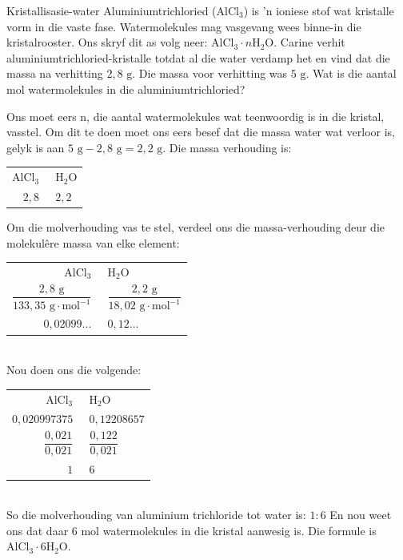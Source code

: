     \noindent
\par
            \label{m38712*eid672431}
      \noindent
      \begin{wex}{Kristallisasie-water}{
\label{m38712*pid47982}
\label{m38712*id64827}Aluminiumtrichloried (${\text{AlCl}}_{3}$) is  'n ioniese stof wat kristalle vorm in die vaste fase. Watermolekules mag vasgevang wees binne-in die kristalrooster. Ons skryf dit as volg neer: ${\text{AlCl}}_{3} \cdot n{\text{H}}_{2}\text{O}$. Carine verhit  aluminiumtrichloried-kristalle totdat al die water verdamp het en vind dat die massa na verhitting $2,8 \text{ g}$. Die massa voor verhitting was $5 \text{ g}$. Wat is die aantal mol watermolekules in die aluminiumtrichloried?
}
{
Ons moet eers n, die aantal watermolekules wat teenwoordig is in die kristal, vasstel. Om dit te doen moet ons eers besef dat die massa water wat verloor is, gelyk is aan $5 \text{ g} - 2,8 \text{ g} = 2,2 \text{ g}$.
  \label{m38712*id3892}Die massa verhouding is:\\
\begin{tabular}{r@{:}l}
 $\text{AlCl}_3~$ & $~\text{H}_{2}\text{O}$ \\
   $2,8~$ & $~2,2$ \\
\end{tabular}
Om die molverhouding vas te stel, verdeel ons die massa-verhouding deur die molekul\^{e}re massa van elke element:\\
\begin{tabular}{r@{:}l}
 $\text{AlCl}_3~$ & $~\text{H}_{2}\text{O}$ \\
    $\dfrac{2,8 \text{ g}}{133,35 \text{ g} \cdot \text{mol}^{-1}}~$ & $~\dfrac{2,2 \text{ g}}{18,02 \text{ g} \cdot \text{mol}^{-1}}$ \\
$0,02099...~$ & $~0,12...$  \\
\end{tabular}\\
Nou doen ons die volgende: \\
\begin{tabular}{r@{:}l}
 $\text{AlCl}_3~$ & $~\text{H}_{2}\text{O}$ \\
$0,020997375~$ & $~0,12208657$ \\
$\dfrac{0,021}{0,021}~$ & $~\dfrac{0,122}{0,021}$ \\
$1~$ & $~6$ \\
\end{tabular}\\
So die molverhouding van aluminium trichloride tot water is: $1:6$
En nou weet ons dat daar $6$ mol watermolekules in die kristal aanwesig is. Die formule is $\text{AlCl}_{3} \cdot 6\text{H}_{2}\text{O}$.
}
    \end{wex}
